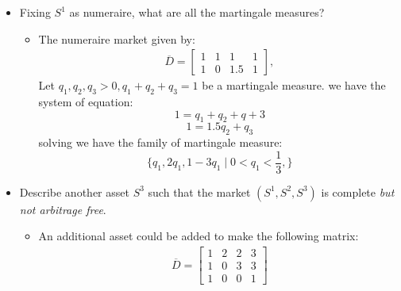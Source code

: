 \documentclass[12pt]{article}
\newcommand{\ol}{\overline}
\begin{document}
\begin{enumerate}
\begin{itemize}
\begin{itemize}
       
       
        \end{itemize}
        \item Fixing $S^1$ as numeraire, what are all the martingale measures?
        \begin{itemize}
           
          \item The numeraire market given by:\\
             \begin{align*}
    \ol{D}=
    \left[\begin{array}{llll}
    1 & 1 & 1 & 1\\
    1 & 0 & 1.5 & 1
    \end{array}
    \right],
    \end{align*}
    Let $q_1,q_2,q_3 >0, q_1 + q_2 +q_3 =1$ be a martingale measure.
    we have the system of equation:
    $$1=q_1+q_2+q+3$$
    $$1=1.5q_2+q_3$$
    solving we have the family of martingale measure:
    $$\{q_1,2q_1,1-3q_1\mid 0<q_1<\frac{1}{3},\}$$
    
    
    
    
   
          
        \end{itemize}
        \item Describe another asset $S^3$ such that the market $(S^1, S^2, S^3)$ is complete
        \emph{but not arbitrage free}.
        \begin{itemize}
            \item         An additional asset could be added to make the following matrix:
            \begin{align*}
    \ol{D}=
    \left[\begin{array}{llll}
    1 & 2 & 2 & 3\\
    1 & 0 & 3 & 3 \\
    1 & 0 & 0 & 1
    \end{array}
    \right]
    \end{align*}
        \end{itemize}


\end{itemize}
\end{enumerate}
\end{document}
